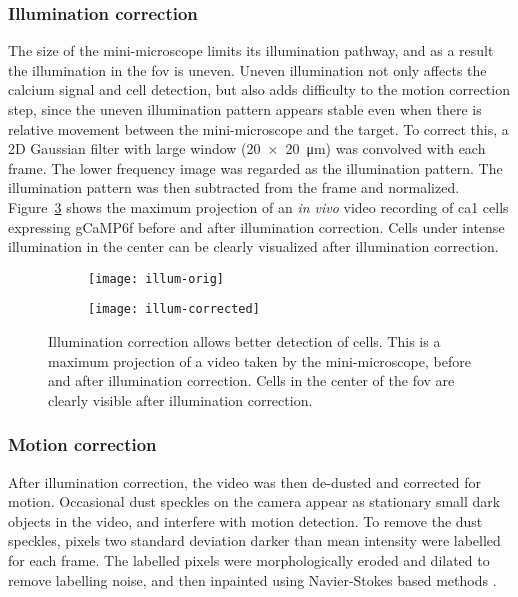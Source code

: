 \subsubsection{Illumination correction}
The size of the mini-microscope limits its illumination pathway, and as a result the illumination in the \gls{fov} is uneven. Uneven illumination not only affects the calcium signal and cell detection, but also adds difficulty to the motion correction step, since the uneven illumination pattern appears stable even when there is relative movement between the mini-microscope and the target. To correct this, a 2D Gaussian filter with large window (\SI{20x20}{\um}) was convolved with each frame. The lower frequency image was regarded as the illumination pattern. The illumination pattern was then subtracted from the frame and normalized. Figure~\ref{f.illumination} shows the maximum projection of an \textit{in vivo} video recording of \gls{ca1} cells expressing gCaMP6f before and after illumination correction. Cells under intense illumination in the center can be clearly visualized after illumination correction.

\begin{figure}[h]
    \begin{subfigure}[t]{.5\textwidth}
        \centering
        \texttt{[image: illum-orig]}
        \caption{\label{illum.orig}}
    \end{subfigure}
    \begin{subfigure}[t]{.5\textwidth}
        \centering
        \texttt{[image: illum-corrected]}
        \caption{\label{illum.corrected}}
    \end{subfigure}
    \caption[Illumination correction.]{Illumination correction allows better detection of cells. This is a maximum projection of a video taken by the mini-microscope, before  and after  illumination correction. Cells in the center of the \gls{fov} are clearly visible after illumination correction. \label{f.illumination}}
\end{figure}

\subsubsection{Motion correction}
After illumination correction, the video was then de-dusted and corrected for motion. Occasional dust speckles on the camera appear as stationary small dark objects in the video, and interfere with motion detection. To remove the dust speckles, pixels two standard deviation darker than mean intensity were labelled for each frame. The labelled pixels were morphologically eroded and dilated to remove labelling noise, and then inpainted using Navier-Stokes based methods \citep{bertalmio01}.

